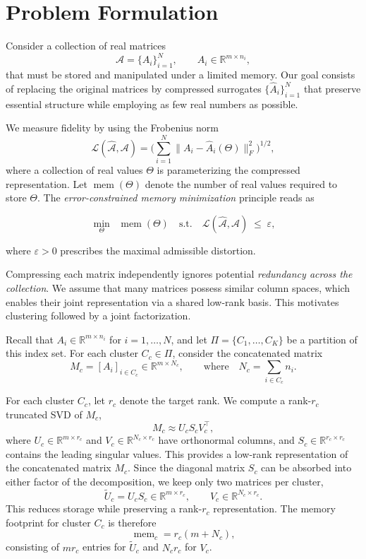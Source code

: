 \documentclass[10pt]{article} %
\begin{document}
\section{Problem Formulation}

Consider a collection of real matrices
\begin{equation}
\label{eq:matrix_set}
\mathcal{A}=\{A_i\}_{i=1}^N, 
\qquad A_i\in \mathbb{R}^{m\times n_i},
\end{equation}
that must be stored and manipulated under a limited memory. Our goal consists of replacing the original matrices by compressed surrogates $\{\widehat{A}_i \}_{i=1}^{N}$ that preserve essential structure while employing as few real numbers as possible.  

We measure fidelity by using the Frobenius norm
\[
\mathcal{L}(\widehat{\mathcal{A}},\mathcal{A})=\Bigg(\sum_{i=1}^N \|A_i-\widehat{A}_i(\Theta)\|_F^2\Bigg)^{1/2},
\]
where a collection of real values $\Theta$ is parameterizing the compressed representation. Let $\operatorname{mem}(\Theta)$ denote the number of real values required to store $\Theta$. The \emph{error-constrained memory minimization} principle reads as

\begin{equation}
\min_{\Theta}\;\; \operatorname{mem}(\Theta)
\quad\text{s.t.}\quad 
 \mathcal{L}(\widehat{\mathcal{A}},\mathcal{A}) \;\leq\; \varepsilon,
\label{eq:general}
\end{equation}

where $\varepsilon>0$ prescribes the maximal admissible distortion.  

Compressing each matrix independently ignores potential \emph{redundancy across the collection}. We assume that many matrices possess similar column spaces, which enables their joint representation via a shared low-rank basis. This motivates clustering followed by a joint factorization.

Recall that \(A_i \in \mathbb{R}^{m\times n_i}\) for \(i = 1,\dots,N\),
and let \(\Pi = \{C_1,\dots,C_K\}\) be a partition of this index set.
For each cluster \(C_c \in \Pi\), consider the concatenated matrix
\[
M_c = [A_i]_{i\in C_c} \in \mathbb{R}^{m\times N_c},
\qquad\text{where}\quad
N_c = \sum_{i\in C_c} n_i.
\]

For each cluster \(C_c\), let \(r_c\) denote the target rank. 
We compute a rank-\(r_c\) truncated SVD of \(M_c\),
\[
M_c \approx U_c S_c V_c^\top,
\]
where \(U_c \in \mathbb{R}^{m\times r_c}\) and \(V_c \in \mathbb{R}^{N_c\times r_c}\) have orthonormal columns, 
and \(S_c \in \mathbb{R}^{r_c\times r_c}\) contains the leading singular values.
This provides a low-rank representation of the concatenated matrix \(M_c\).
Since the diagonal matrix \(S_c\) can be absorbed into either factor of the
decomposition, we keep only two matrices per cluster,
\[
\widetilde U_c = U_c S_c \in \mathbb{R}^{m\times r_c},
\qquad 
V_c \in \mathbb{R}^{N_c\times r_c}.
\]
This reduces storage while preserving a rank-\(r_c\) representation.
The memory footprint for cluster \(C_c\) is therefore
\[
\operatorname{mem}_c = r_c(m+N_c),
\]
consisting of \(mr_c\) entries for \(\widetilde U_c\) and \(N_cr_c\) for \(V_c\).
\end{document}

